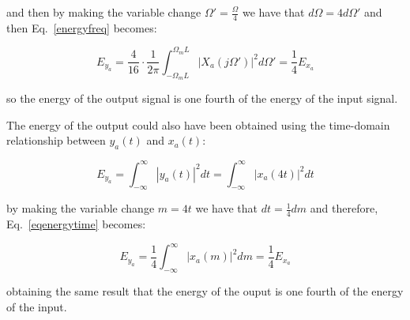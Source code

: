 \documentclass[a4paper,11pt,oneside]{article}
\begin{document}
and then by making the variable change $\Omega'=\frac{\Omega}{4}$ we have that $d\Omega=4d\Omega'$ and then Eq.~\ref{energyfreq} becomes:

\begin{equation}
E_{y_a}= \frac{4}{16}\cdot\frac{1}{2\pi}\int_{-\Omega_mL}^{\Omega_mL}|X_a(j\Omega')|^2d\Omega'=\frac{1}{4}E_{x_a}
\end{equation}

so the energy of the output signal is one fourth of the energy of the input signal.

The energy of the output could also have been obtained using the time-domain relationship between $y_a(t)$ and $x_a(t)$:

\begin{equation}\label{eqenergytime}
E_{y_a}=\int_{-\infty}^{\infty}|y_a(t)|^2dt=\int_{-\infty}^{\infty}|x_a(4t)|^2dt
\end{equation}

by making the variable change $m=4t$ we have that $dt=\frac{1}{4}dm$ and therefore, Eq.~\ref{eqenergytime} becomes:


\begin{equation}
E_{y_a}=\frac{1}{4}\int_{-\infty}^{\infty}|x_a(m)|^2dm=\frac{1}{4}E_{x_a}
\end{equation}

obtaining the same result that the energy of the ouput is one fourth of the energy of the input.
\end{document}
